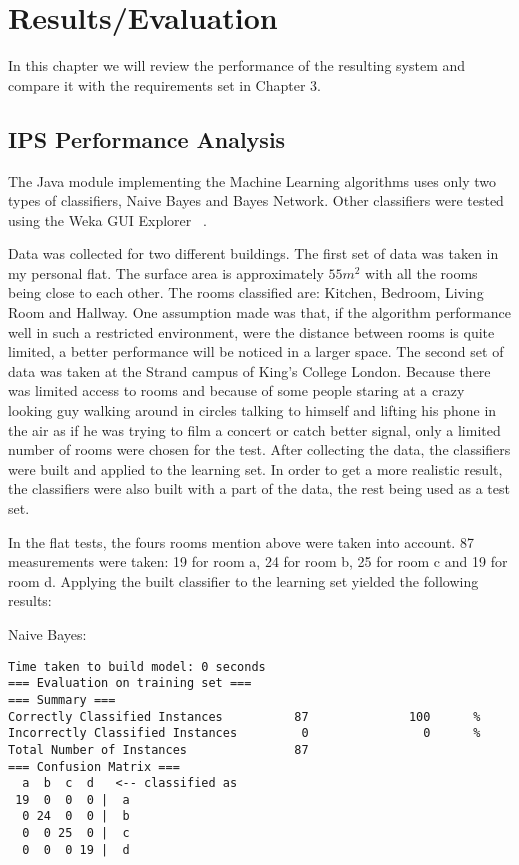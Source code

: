 \chapter{Results/Evaluation}
In this chapter we will review the performance of the resulting system and compare it with the requirements set in Chapter 3.
\section{IPS Performance Analysis}

The Java module implementing the Machine Learning algorithms uses only two types of classifiers, Naive Bayes and Bayes Network. Other classifiers were tested using the Weka GUI Explorer ~\cite{Weka}. 

Data was collected for two different buildings. The first set of data was taken in my personal flat. The surface area is approximately $55 m^2$ with all the rooms being close to each other. The rooms classified are: Kitchen, Bedroom, Living Room and Hallway. One assumption made was that, if the algorithm performance well in such a restricted environment, were the distance between rooms is quite limited, a better performance will be noticed in a larger space. The second set of data was taken at the Strand campus of King's College London. Because there was limited access to rooms and because of some people staring at a crazy looking guy walking around in circles talking to himself and lifting his phone in the air as if he was trying to film a concert or catch better signal, only a limited number of rooms were chosen for the test. After collecting the data, the classifiers were built and applied to the learning set. In order to get a more realistic result, the classifiers were also built with a part of the data, the rest being used as a test set.

In the flat tests, the fours rooms mention above were taken into account. 87 measurements were taken: 19 for room a, 24 for room b, 25 for room c and 19 for room d. Applying the built classifier to the learning set yielded the following results:

\noindent Naive Bayes:
\begin{lstlisting}
Time taken to build model: 0 seconds
=== Evaluation on training set ===
=== Summary ===
Correctly Classified Instances          87              100      %
Incorrectly Classified Instances         0                0      %
Total Number of Instances               87     
=== Confusion Matrix ===
  a  b  c  d   <-- classified as
 19  0  0  0 |  a
  0 24  0  0 |  b
  0  0 25  0 |  c
  0  0  0 19 |  d
\end{lstlisting}

